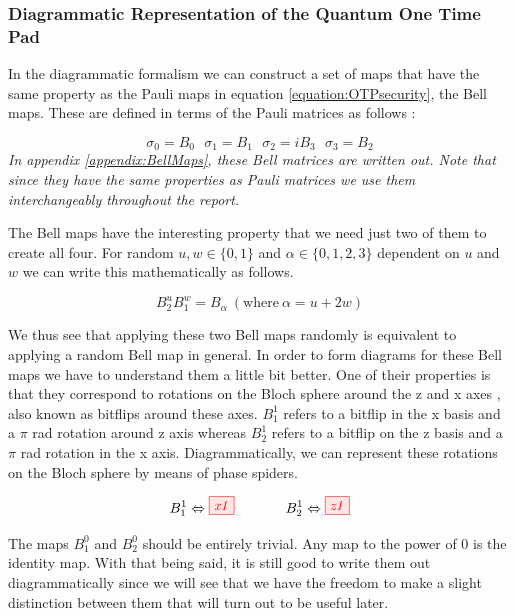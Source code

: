 \documentclass[]{article}
\begin{document}
\subsubsection{Diagrammatic Representation of the Quantum One Time Pad}
\label{DiagramRepresentationQOTP}
In the diagrammatic formalism we can construct a set of maps that have the same property as the Pauli maps in equation \ref{equation:OTPsecurity}, the Bell maps. These are defined in terms of the Pauli matrices as follows \cite{Coecke2017}:

\begin{equation}
\label{equation:bellsigmas}
	\sigma_0 = B_0 ~~~ \sigma_1 = B_1 ~~~ \sigma_2 = iB_3 ~~~ \sigma_3 = B_2 
\end{equation}
\textit{In appendix \ref{appendix:BellMaps}, these Bell matrices are written out. Note that since they have the same properties as Pauli matrices we use them interchangeably throughout the report.}

The Bell maps have the interesting property that we need just two of them to create all four. For random $u, w \in \{0,1\}$ and $\alpha \in \{0,1,2,3\}$ dependent on $u$ and $w$ we can write this mathematically as follows.

\begin{equation}
\label{randombell}
	B_2^uB_1^w = B_\alpha ~(\text{where}\ \alpha = u + 2w)
\end{equation}

We thus see that applying these two Bell maps randomly is equivalent to applying a random Bell map in general. In order to form diagrams for these Bell maps we have to understand them a little bit better. One of their properties is that they correspond to rotations on the Bloch sphere around the z and x axes \cite{DJORDJEVIC2012227}, also known as bitflips around these axes. $B_1^1$ refers to a bitflip in the x basis and a $\pi$ rad rotation around z axis whereas $B_2^1$ refers to a bitflip on the z basis and a $\pi$ rad rotation in the x axis. Diagrammatically, we can represent these rotations on the Bloch sphere by means of phase spiders.

\begin{equation}
	B_1^1 \Leftrightarrow \tikzfig{x1} ~~~~~~~~~~~ B_2^1 \Leftrightarrow \tikzfig{z1}
\end{equation}

The maps $B_1^0$ and $B_2^0$ should be entirely trivial. Any map to the power of 0 is the identity map. With that being said, it is still good to write them out diagrammatically since we will see that we have the freedom to make a slight distinction between them that will turn out to be useful later.
\end{document}
